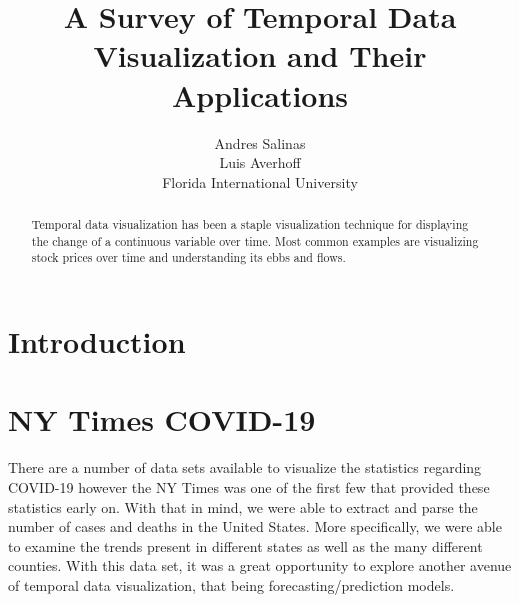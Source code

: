 \documentclass[twocolumn]{article}
\title{A Survey of Temporal Data Visualization and Their Applications}
\author{Andres Salinas\\Luis Averhoff\\Florida International University}
\date{}
\begin{document}
	\maketitle
	
	\begin{abstract}
		Temporal data visualization has been a staple visualization technique for displaying the change of a continuous variable over time. Most common examples are visualizing stock prices over time and understanding its ebbs and flows. 
	\end{abstract}

	\section{Introduction}
	
	\section{NY Times COVID-19}
	There are a number of data sets available to visualize the statistics regarding COVID-19 however the NY Times was one of the first few that provided these statistics early on. With that in mind, we were able to extract and parse the number of cases and deaths in the United States. More specifically, we were able to examine the trends present in different states as well as the many different counties. With this data set, it was a great opportunity to explore another avenue of temporal data visualization, that being forecasting/prediction models. 
	
\end{document}
